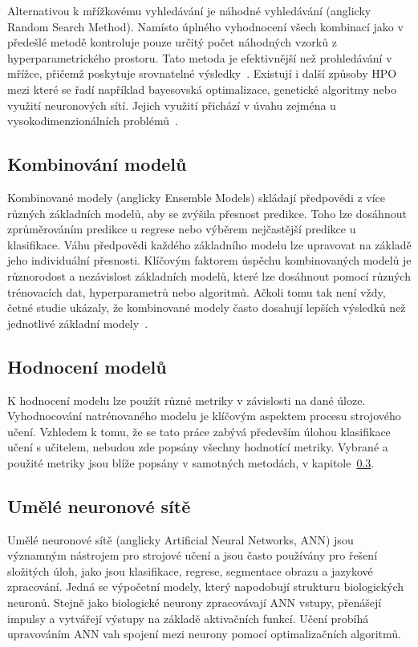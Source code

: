 Alternativou k mřížkovému vyhledávání je náhodné vyhledávání (anglicky Random
Search Method). Namísto úplného vyhodnocení všech kombinací jako v předešlé
metodě kontroluje pouze určitý počet náhodných vzorků z hyperparametrického
prostoru. Tato metoda je efektivnější než prohledávání v mřížce, přičemž
poskytuje srovnatelné
výsledky~\cite{anggoro2021,bergstra2012,Liashchynskyi2019}. Existují i další
způsoby HPO mezi které se řadí například bayesovská optimalizace, genetické
algoritmy nebo využití neuronových sítí. Jejich využití přichází v úvahu zejména
u vysokodimenzionálních problémů~\cite{Alibrahim2021,Liashchynskyi2019}.

\subsection{Kombinování modelů}
Kombinované modely (anglicky Ensemble Models) skládají předpovědi z více různých
základních modelů, aby se zvýšila přesnost predikce. Toho lze dosáhnout
zprůměrováním predikce u regrese nebo výběrem nejčastější predikce u
klasifikace. Váhu předpovědi každého základního modelu lze upravovat na základě
jeho individuální přesnosti. Klíčovým faktorem úspěchu kombinovaných modelů je
různorodost a nezávislost základních modelů, které lze dosáhnout pomocí různých
trénovacích dat, hyperparametrů nebo algoritmů. Ačkoli tomu tak není vždy, četné
studie ukázaly, že kombinované modely často dosahují lepších výsledků než
jednotlivé základní modely~\cite{Parker2013}.

\subsection{Hodnocení modelů}
K hodnocení modelu lze použít různé metriky v závislosti na dané úloze.
Vyhodnocování natrénovaného modelu je klíčovým aspektem procesu strojového
učení. Vzhledem k tomu, že se tato práce zabývá především úlohou klasifikace
učení s učitelem, nebudou zde popsány všechny hodnotící metriky. Vybrané a
použité metriky jsou blíže popsány v samotných metodách, v kapitole~\ref{}.

\subsection{Umělé neuronové sítě}
Umělé neuronové sítě (anglicky Artificial Neural Networks, \gls{ANN}) jsou
významným nástrojem pro strojové učení a jsou často používány pro řešení
složitých úloh, jako jsou klasifikace, regrese, segmentace obrazu a jazykové
zpracování. Jedná se výpočetní modely, který napodobují strukturu biologických
neuronů. Stejně jako biologické neurony zpracovávají \gls{ANN} vstupy, přenášejí
impulsy a vytvářejí výstupy na základě aktivačních funkcí. Učení probíhá
upravováním ANN vah spojení mezi neurony pomocí optimalizačních algoritmů.


